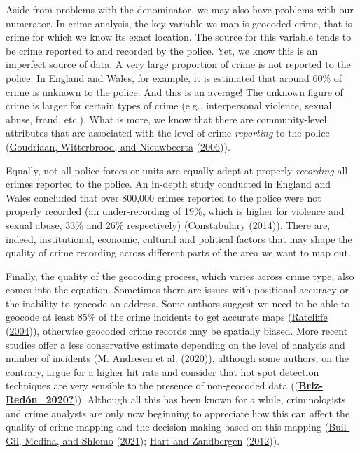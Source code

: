 \documentclass[
  krantz2]{krantz}
\begin{document}
Aside from problems with the denominator, we may also have problems with our numerator. In crime analysis, the key variable we map is geocoded crime, that is crime for which we know its exact location. The source for this variable tends to be crime reported to and recorded by the police. Yet, we know this is an imperfect source of data. A very large proportion of crime is not reported to the police. In England and Wales, for example, it is estimated that around 60\% of crime is unknown to the police. And this is an average! The unknown figure of crime is larger for certain types of crime (e.g., interpersonal violence, sexual abuse, fraud, etc.). What is more, we know that there are community-level attributes that are associated with the level of crime \emph{reporting} to the police (\protect\hyperlink{ref-Goudriaan_2006}{Goudriaan, Witterbrood, and Nieuwbeerta} (\protect\hyperlink{ref-Goudriaan_2006}{2006})).

Equally, not all police forces or units are equally adept at properly \emph{recording} all crimes reported to the police. An in-depth study conducted in England and Wales concluded that over 800,000 crimes reported to the police were not properly recorded (an under-recording of 19\%, which is higher for violence and sexual abuse, 33\% and 26\% respectively) (\protect\hyperlink{ref-HMIC_2014}{Constabulary} (\protect\hyperlink{ref-HMIC_2014}{2014})). There are, indeed, institutional, economic, cultural and political factors that may shape the quality of crime recording across different parts of the area we want to map out.

Finally, the quality of the geocoding process, which varies across crime type, also comes into the equation. Sometimes there are issues with positional accuracy or the inability to geocode an address. Some authors suggest we need to be able to geocode at least 85\% of the crime incidents to get accurate maps (\protect\hyperlink{ref-Ratcliffe_2004}{Ratcliffe} (\protect\hyperlink{ref-Ratcliffe_2004}{2004})), otherwise geocoded crime records may be spatially biased. More recent studies offer a less conservative estimate depending on the level of analysis and number of incidents (\protect\hyperlink{ref-Andresen_2020}{M. Andresen et al.} (\protect\hyperlink{ref-Andresen_2020}{2020})), although some authors, on the contrary, argue for a higher hit rate and consider that hot spot detection techniques are very sensible to the presence of non-geocoded data ((\protect\hyperlink{ref-Briz-Reduxf3n_2020}{\textbf{Briz-Redón\_2020?}})). Although all this has been known for a while, criminologists and crime analysts are only now beginning to appreciate how this can affect the quality of crime mapping and the decision making based on this mapping (\protect\hyperlink{ref-Buil-Gil_2021}{Buil-Gil, Medina, and Shlomo} (\protect\hyperlink{ref-Buil-Gil_2021}{2021}); \protect\hyperlink{ref-Hart_2012}{Hart and Zandbergen} (\protect\hyperlink{ref-Hart_2012}{2012})).
\end{document}
